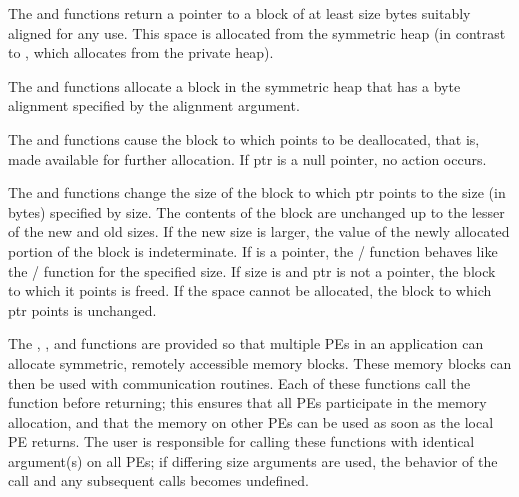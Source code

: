 {
       The  \cbstart and   functions return \cbend a pointer to a block of at least size
       bytes suitably aligned for any use.  This space is allocated from the
       symmetric heap (in contrast to , which allocates from the
       private heap).

       The   \cbstart and  functions allocate \cbend a block in the symmetric heap that
       has a byte \cbstart alignment \cbend specified by the alignment argument.

       The  \cbstart and  functions cause \cbend the block to which  points to be
       deallocated, that is, made available for further allocation.  If ptr is
       a null pointer, no action occurs. 
              
       The   \cbstart and   functions change \cbend the size of the block to which ptr
       points to the size (in bytes) specified by size.  The contents of the
       block are unchanged up to the lesser of the new and old sizes. If the
       new size is larger, the value of the newly allocated portion of the
       block is indeterminate.  
       If  is a  pointer, the \cbstart {}/ \cbend function behaves like the \cbstart {}/ \cbend function for the specified size.  If size  is  and ptr is not a  pointer, the block to which it points is freed. If the space cannot be allocated, the block to which ptr points is unchanged.

       The , , and  functions are provided  so that multiple \ac{PE}s in an application can allocate symmetric, remotely
       accessible memory blocks.  These memory blocks can then be used with
       \openshmem communication routines.  Each of these functions call the
        function before returning; this ensures that all
       \ac{PE}s participate in the memory allocation, and that the memory on other
       \ac{PE}s can be used	as  soon as the local \ac{PE} returns.  The user is
       responsible for calling these functions with identical argument(s) on
       all \ac{PE}s; if differing size arguments are used, the behavior of the call and any subsequent \openshmem calls becomes undefined.
}
